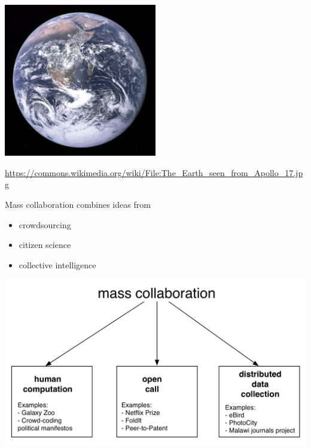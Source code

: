 \documentclass[aspectratio=169]{beamer}
\def\vf{\vfill}
\begin{document}
\begin{frame}

\begin{center}
\includegraphics[width=0.5\textwidth]{figures/blue_marble}
\end{center}

\vf
\tiny{\url{https://commons.wikimedia.org/wiki/File:The_Earth_seen_from_Apollo_17.jpg}}

\end{frame}
\begin{frame}

Mass collaboration combines ideas from 
\begin{itemize}
\item crowdsourcing
\item citizen science
\item collective intelligence
\end{itemize}

\end{frame}
\begin{frame}

\begin{center}
\includegraphics[width=\textwidth]{figures/mass_collaboration_schematic}
\end{center}

\end{frame}
\end{document}
